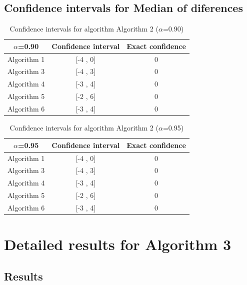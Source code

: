 \documentclass[a4paper,10pt]{article}
\begin{document}
\subsection{Confidence intervals for Median of diferences}

\begin{table}[!htp]
\centering\small
\begin{tabular}{
|c|c|c|}
\hline
 $\alpha$=0.90 & Confidence interval & Exact confidence \\ \hline 
Algorithm 1 & [-4 , 0] & 0\\ \hline 
Algorithm 3 & [-4 , 3] & 0\\ \hline 
Algorithm 4 & [-3 , 4] & 0\\ \hline 
Algorithm 5 & [-2 , 6] & 0\\ \hline 
Algorithm 6 & [-3 , 4] & 0\\ \hline 

\end{tabular}
\caption{Confidence intervals for algorithm Algorithm 2 ($\alpha$=0.90)}
\end{table}
\begin{table}[!htp]
\centering\small
\begin{tabular}{
|c|c|c|}
\hline
 $\alpha$=0.95 & Confidence interval & Exact confidence \\ \hline 
Algorithm 1 & [-4 , 0] & 0\\ \hline 
Algorithm 3 & [-4 , 3] & 0\\ \hline 
Algorithm 4 & [-3 , 4] & 0\\ \hline 
Algorithm 5 & [-2 , 6] & 0\\ \hline 
Algorithm 6 & [-3 , 4] & 0\\ \hline 

\end{tabular}
\caption{Confidence intervals for algorithm Algorithm 2 ($\alpha$=0.95)}
\end{table}

 \clearpage 


\section{Detailed results for Algorithm 3}


\subsection{Results}
\end{document}
